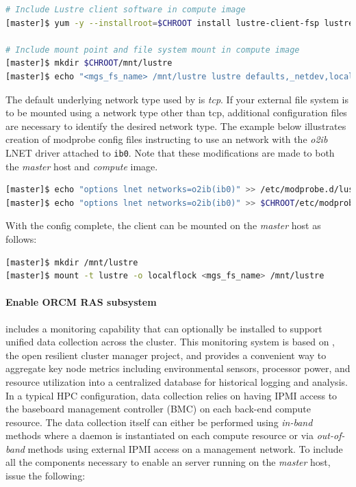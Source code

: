\documentclass[letterpaper]{article}
\begin{document}
\begin{lstlisting}[language=bash,keywords={},upquote=true]
# Include Lustre client software in compute image
[master]$ yum -y --installroot=$CHROOT install lustre-client-fsp lustre-client-fsp-modules

# Include mount point and file system mount in compute image
[master]$ mkdir $CHROOT/mnt/lustre
[master]$ echo "<mgs_fs_name> /mnt/lustre lustre defaults,_netdev,localflock 0 0" >> $CHROOT/etc/fstab
\end{lstlisting}

The default underlying network type used by \Lustre{} is {\em tcp}. If your
external \Lustre{} file system is to be mounted using a network type other than
tcp, additional configuration files are necessary to identify the desired
network type. The example below illustrates creation of modprobe config files
instructing \Lustre{} to use an \InfiniBand{} network with the {\em o2ib} LNET driver
attached to \texttt{ib0}. Note that these modifications are made to both the
{\em master} host and {\em compute} image.

\begin{lstlisting}[language=bash,keywords={},upquote=true]
[master]$ echo "options lnet networks=o2ib(ib0)" >> /etc/modprobe.d/lustre.conf
[master]$ echo "options lnet networks=o2ib(ib0)" >> $CHROOT/etc/modprobe.d/lustre.conf
\end{lstlisting}

With the \Lustre{} config complete, the client can be mounted on the {\em master}
host as follows:
\begin{lstlisting}[language=bash,keywords={},upquote=true]
[master]$ mkdir /mnt/lustre
[master]$ mount -t lustre -o localflock <mgs_fs_name> /mnt/lustre
\end{lstlisting}



\paragraph{Enable ORCM RAS subsystem} 

\FSP{} includes a monitoring capability that can optionally be installed to
support unified data collection across the cluster. This monitoring system is
based on \ORCM{}, the open resilient cluster manager project, and provides a
convenient way to aggregate key node metrics including environmental sensors,
processor power, and resource utilization into a centralized database for
historical logging and analysis.  In a typical HPC configuration, \ORCM{} data
collection relies on having IPMI access to the baseboard management controller
(BMC) on each back-end compute resource. The data collection itself can either
be performed using {\em in-band} methods where a daemon is instantiated on each
compute resource or via {\em out-of-band} methods using external IPMI access on
a management network. To include all the components necessary to enable an \ORCM{}
server running on the {\em master} host, issue the following:
\end{document}
